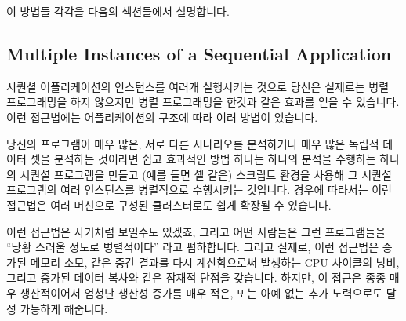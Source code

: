 이 방법들 각각을 다음의 섹션들에서 설명합니다.

\subsection{Multiple Instances of a Sequential Application}
\label{sec:intro:Multiple Instances of a Sequential Application}

시퀀셜 어플리케이션의 인스턴스를 여러개 실행시키는 것으로 당신은 실제로는 병렬
프로그래밍을 하지 않으지만 병렬 프로그래밍을 한것과 같은 효과를 얻을 수
있습니다.
이런 접근법에는 어플리케이션의 구조에 따라 여러 방법이 있습니다.

당신의 프로그램이 매우 많은, 서로 다른 시나리오를 분석하거나 매우 많은 독립적
데이터 셋을 분석하는 것이라면 쉽고 효과적인 방법 하나는 하나의 분석을 수행하는
하나의 시퀀셜 프로그램을 만들고 (예를 들면  셸 같은) 스크립트 환경을
사용해 그 시퀀셜 프로그램의 여러 인스턴스를 병렬적으로 수행시키는 것입니다.
경우에 따라서는 이런 접근법은 여러 머신으로 구성된 클러스터로도 쉽게 확장될 수
있습니다.

이런 접근법은 사기처럼 보일수도 있겠죠, 그리고 어떤 사람들은 그런 프로그램들을
``당황 스러울 정도로 병렬적이다'' 라고 폄하합니다.
그리고 실제로, 이런 접근법은 증가된 메모리 소모, 같은 중간 결과를 다시
계산함으로써 발생하는 CPU 사이클의 낭비, 그리고 증가된 데이터 복사와 같은
잠재적 단점을 갖습니다.
하지만, 이 접근은 종종 매우 생산적이어서 엄청난 생산성 증가를 매우 적은, 또는
아예 없는 추가 노력으로도 달성 가능하게 해줍니다.

